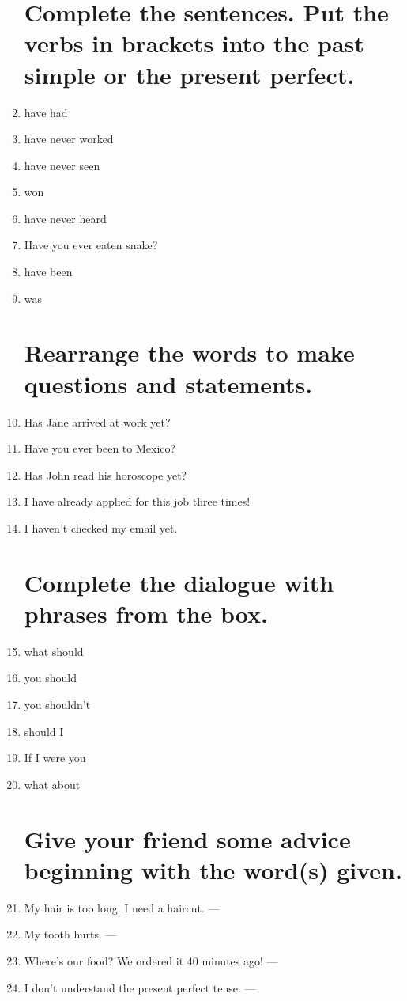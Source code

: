 \documentclass[a5paper, 10pt, final]{extreport}
\begin{document}
\begin{enumerate}
\section{Complete the sentences. Put the verbs in brackets into the past simple or the present perfect.}
\item have had
\item have never worked
\item have never seen
\item won
\item have never heard
\item Have you ever eaten snake?
\item have been
\item was

\section{Rearrange the words to make questions and statements.}
\item Has Jane arrived at work yet?
\item Have you ever been to Mexico?
\item Has John read his horoscope yet? 
\item I have already applied for this job three times! 
\item I haven't checked my email yet.

\section{Complete the dialogue with phrases from the box.}
\item what should
\item you should
\item you shouldn't
\item should I
\item If I were you
\item what about

\section{Give your friend some advice beginning with the word(s) given.}
\item My hair is too long. I need a haircut. ---

\item My tooth hurts. ---

\item Where's our food? We ordered it 40 minutes ago! ---

\item I don't understand the present perfect tense. ---

\end{enumerate}
\end{document}
